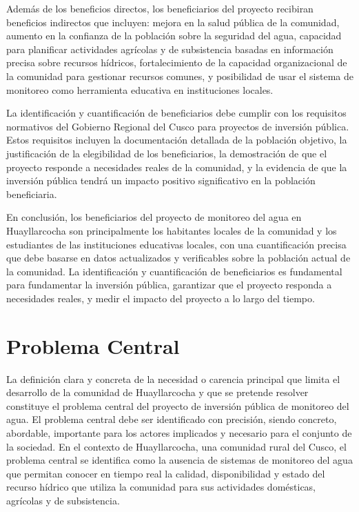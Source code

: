 Además de los beneficios directos, los beneficiarios del proyecto recibiran beneficios indirectos que incluyen: mejora en la salud pública de la comunidad, aumento en la confianza de la población sobre la seguridad del agua, capacidad para planificar actividades agrícolas y de subsistencia basadas en información precisa sobre recursos hídricos, fortalecimiento de la capacidad organizacional de la comunidad para gestionar recursos comunes, y posibilidad de usar el sistema de monitoreo como herramienta educativa en instituciones locales.

La identificación y cuantificación de beneficiarios debe cumplir con los requisitos normativos del Gobierno Regional del Cusco para proyectos de inversión pública. Estos requisitos incluyen la documentación detallada de la población objetivo, la justificación de la elegibilidad de los beneficiarios, la demostración de que el proyecto responde a necesidades reales de la comunidad, y la evidencia de que la inversión pública tendrá un impacto positivo significativo en la población beneficiaria.

En conclusión, los beneficiarios del proyecto de monitoreo del agua en Huayllarcocha son principalmente los habitantes locales de la comunidad y los estudiantes de las instituciones educativas locales, con una cuantificación precisa que debe basarse en datos actualizados y verificables sobre la población actual de la comunidad. La identificación y cuantificación de beneficiarios es fundamental para fundamentar la inversión pública, garantizar que el proyecto responda a necesidades reales, y medir el impacto del proyecto a lo largo del tiempo.


\section{Problema Central}

La definición clara y concreta de la necesidad o carencia principal que limita el desarrollo de la comunidad de Huayllarcocha y que se pretende resolver constituye el problema central del proyecto de inversión pública de monitoreo del agua. El problema central debe ser identificado con precisión, siendo concreto, abordable, importante para los actores implicados y necesario para el conjunto de la sociedad. En el contexto de Huayllarcocha, una comunidad rural del Cusco, el problema central se identifica como la ausencia de sistemas de monitoreo del agua que permitan conocer en tiempo real la calidad, disponibilidad y estado del recurso hídrico que utiliza la comunidad para sus actividades domésticas, agrícolas y de subsistencia.

